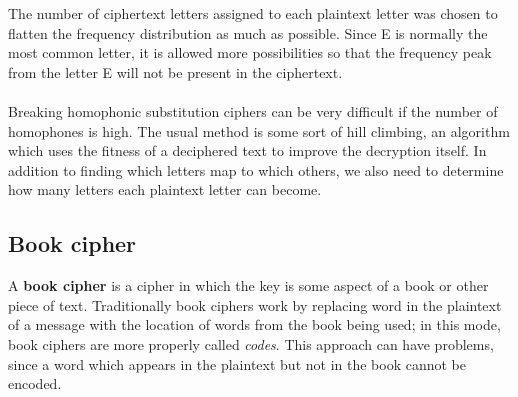 \documentclass[Lau,binding=0.6cm,oneside]{sapthesis}
\begin{document}
The number of ciphertext letters assigned to each plaintext letter was chosen to flatten the frequency distribution as much as possible. Since E is normally the most common letter, it is allowed more possibilities so that the frequency peak from the letter E will not be present in the ciphertext.\\\\
Breaking homophonic substitution ciphers can be very difficult if the number of homophones is high. The usual method is some sort of hill climbing, an algorithm which uses the fitness of a deciphered text to improve the decryption itself. In addition to finding which letters map to which others, we also need to determine how many letters each plaintext letter can become.

\subsection{Book cipher}
A \textbf{book cipher} is a cipher in which the key is some aspect of a book or other piece of text. Traditionally book ciphers work by replacing word in the plaintext of a message with the location of words from the book being used; in this mode, book ciphers are more properly called \textit{codes}. This approach can have problems, since a word which appears in the plaintext but not in the book cannot be encoded.\\\\
\end{document}
